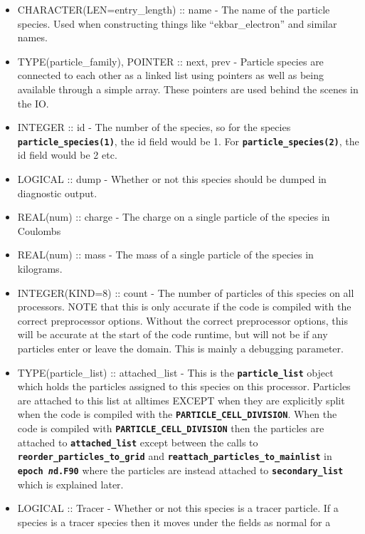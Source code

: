 \documentclass[12pt,a4paper]{article}
\newcommand{\inlinecode}[1]{{\color{warwickred} \bf\texttt{#1}}}
\begin{document}
\begin{itemize}
\item CHARACTER(LEN=entry\_length) :: name - The name of the particle
  species. Used when constructing things like ``ekbar\_electron'' and similar
  names.
\item TYPE(particle\_family), POINTER :: next, prev - Particle species are
  connected to each other as a linked list using pointers as well as being
  available through a simple array. These pointers are used behind the scenes
  in the IO.
\item INTEGER :: id - The number of the species, so for the species
  \inlinecode{particle\_species(1)}, the id field would be 1. For
  \inlinecode{particle\_species(2)}, the id field would be 2 etc.
\item LOGICAL :: dump - Whether or not this species should be dumped in
  diagnostic output.
\item REAL(num) :: charge - The charge on a single particle of the species in
  Coulombs
\item REAL(num) :: mass - The mass of a single particle of the species in
  kilograms.
\item INTEGER(KIND=8) :: count - The number of particles of this species on
  all processors. NOTE that this is only accurate if the code is compiled with
  the correct preprocessor options. Without the correct preprocessor options,
  this will be accurate at the start of the code runtime, but will not be if
  any particles enter or leave the domain. This is mainly a debugging
  parameter.
\item TYPE(particle\_list) :: attached\_list - This is the
  \inlinecode{particle\_list} object which holds the particles assigned to this
  species on this processor. Particles are attached to this list at all\linebreak times
  EXCEPT when they are explicitly split when the code is compiled with the\linebreak
  \inlinecode{PARTICLE\_CELL\_DIVISION}. When the code is compiled with
  \inlinecode{PARTICLE\_CELL\_DIVISION} then the particles are attached to
  \inlinecode{attached\_list} except between the calls to
  \inlinecode{reorder\_particles\_to\_grid} and
  \inlinecode{reattach\_particles\_to\_mainlist} in \inlinecode{epoch{\it
      n}d.F90} where the particles are instead attached to
  \inlinecode{secondary\_list} which is explained later.
\item LOGICAL :: Tracer - Whether or not this species is a tracer particle. If
  a species is a tracer species then it moves under the fields as normal for a

\end{itemize}
\end{document}
